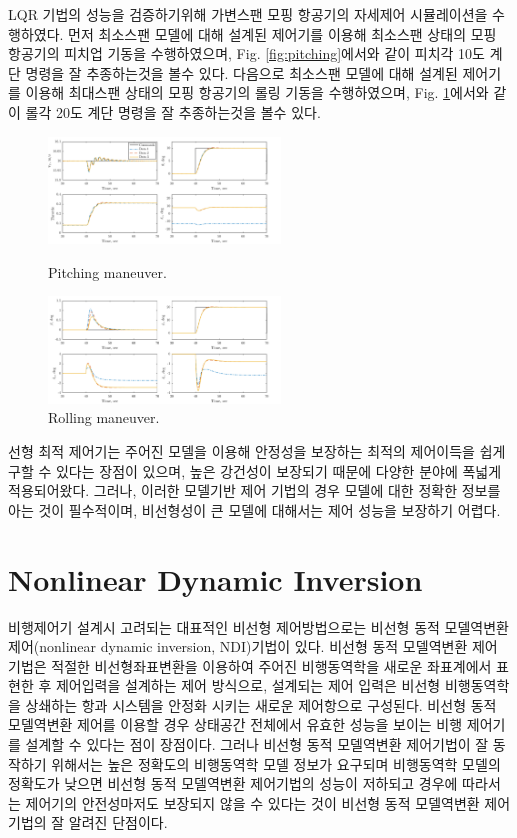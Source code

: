 \documentclass[a4paper, 12pt]{report}
\begin{document}
	LQR 기법의 성능을 검증하기위해 가변스팬 모핑 항공기의 자세제어 시뮬레이션을 수행하였다.
	먼저 최소스팬 모델에 대해 설계된 제어기를 이용해 최소스팬 상태의 모핑 항공기의 피치업 기동을 수행하였으며, Fig. \ref{fig:pitching}에서와 같이 피치각 10도 계단 명령을 잘 추종하는것을 볼수 있다.
	다음으로 최소스팬 모델에 대해 설계된 제어기를 이용해 최대스팬 상태의 모핑 항공기의 롤링 기동을 수행하였으며, Fig. \ref{fig:rolling}에서와 같이 롤각 20도 계단 명령을 잘 추종하는것을 볼수 있다.
	
	\begin{figure}[h]
		\centering
		\includegraphics[width=0.55\textwidth]{./resources/pdf/pitching.png}
		\caption{Pitching maneuver.}
		\label{fig:pitching}
		\centering
		\includegraphics[width=0.55\textwidth]{./resources/pdf/rolling.png}
		\caption{Rolling maneuver.}
		\label{fig:rolling}
	\end{figure}
	
	선형 최적 제어기는 주어진 모델을 이용해 안정성을 보장하는 최적의 제어이득을 쉽게 구할 수 있다는 장점이 있으며, 높은 강건성이 보장되기 때문에 다양한 분야에 폭넓게 적용되어왔다.
	그러나, 이러한 모델기반 제어 기법의 경우 모델에 대한 정확한 정보를 아는 것이 필수적이며, 비선형성이 큰 모델에 대해서는 제어 성능을 보장하기 어렵다.
	
	\chapter{Nonlinear Dynamic Inversion}
	
	비행제어기 설계시 고려되는 대표적인 비선형 제어방법으로는 비선형 동적 모델역변환 제어(nonlinear dynamic inversion, NDI)기법이 있다. 비선형 동적 모델역변환 제어 기법은 적절한 비선형좌표변환을 이용하여 주어진 비행동역학을 새로운 좌표계에서 표현한 후 제어입력을 설계하는 제어 방식으로, 설계되는 제어 입력은 비선형 비행동역학을 상쇄하는 항과 시스템을 안정화 시키는 새로운 제어항으로 구성된다. 비선형 동적 모델역변환 제어를 이용할 경우 상태공간 전체에서 유효한 성능을 보이는 비행 제어기를 설계할 수 있다는 점이 장점이다. 그러나 비선형 동적 모델역변환 제어기법이 잘 동작하기 위해서는 높은 정확도의 비행동역학 모델 정보가 요구되며 비행동역학 모델의 정확도가 낮으면 비선형 동적 모델역변환 제어기법의 성능이 저하되고 경우에 따라서는 제어기의 안전성마저도 보장되지 않을 수 있다는 것이 비선형 동적 모델역변환 제어기법의 잘 알려진 단점이다.
	
\end{document}
